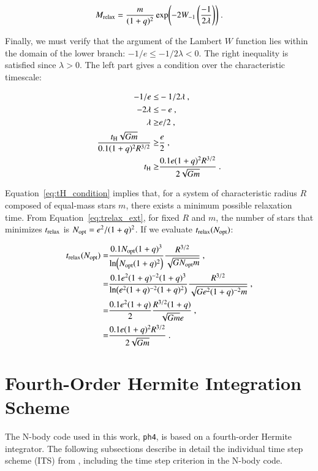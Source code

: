 \begin{appendixs}
	\begin{equation}
		M_{\rm relax} = \frac{m}{(1+q)^2}\exp(-2 W_{-1}\left(\frac{-1}{2\lambda}\right))~.
		\label{eq:Mrelax_lambert_lower}
	\end{equation}
	
	Finally, we must verify that the argument of the Lambert $W$ function lies within the domain of the lower branch: $-1/e \leq -1/2\lambda < 0$. The right inequality is satisfied since $\lambda > 0$. The left part gives a condition over the characteristic timescale:
	
	\begin{align}
		-1/e \leq& -1/2\lambda ~,\\
		-2\lambda \leq& -e ~,\\
		\lambda \geq& e/2 ~,\\
		\frac{t_{\rm H}\sqrt{Gm}}{0.1(1+q)^2R^{3/2}} \geq& \frac{e}{2} ~,\\
		t_{\rm H} \geq& \frac{0.1e(1+q)^2R^{3/2}}{2\sqrt{Gm}}~.
		\label{eq:tH_condition}		
	\end{align}
	
	Equation~\eqref{eq:tH_condition} implies that, for a system of characteristic radius $R$ composed of equal-mass stars $m$, there exists a minimum possible relaxation time. From Equation~\eqref{eq:trelax_ext}, for fixed $R$ and $m$, the number of stars that minimizes $t_{\rm relax}$ is $N_{\rm opt}=e^2/(1+q)^2$. If we evaluate $t_{\rm relax}(N_{\rm opt})$:
	
	\begin{align}
		t_{\rm relax}(N_{\rm opt}) =& \frac{0.1 N_{\rm opt}(1+q)^3}{\ln(N_{\rm opt}(1+q)^2)} \frac{R^{3/2}}{\sqrt{GN_{\rm opt}m}} ~,\\
		=& \frac{0.1 e^2(1+q)^{-2}(1+q)^3}{\ln(e^2(1+q)^{-2}(1+q)^2)} \frac{R^{3/2}}{\sqrt{Ge^2(1+q)^{-2}m}}~,\\
		=& \frac{0.1 e^2(1+q)}{2} \frac{R^{3/2}(1+q)}{\sqrt{Gm}e}~,\\
		=& \frac{0.1 e(1+q)^2 R^{3/2}}{2\sqrt{Gm}}~.
	\end{align}
	
	\section{Fourth-Order Hermite Integration Scheme} 
	\label{ap:A}
	
	The N-body code used in this work, \texttt{ph4}, is based on a fourth-order Hermite integrator. The following subsections describe in detail the individual time step scheme (ITS) from \citet{makino1992}, including the time step criterion in the N-body code.
	

\end{appendixs}

